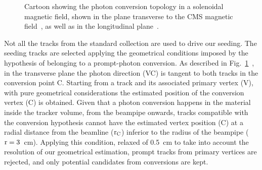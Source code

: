 \documentclass[a4paper]{jpconf}
\begin{document}
\begin{figure}[]
\centering
{}
\caption{Cartoon showing the photon conversion topology in a solenoidal magnetic field,
shown in the plane transverse  to the CMS magnetic field~, as well as  in the longitudinal plane~.}

\label{fig:algo}
\end{figure}

Not all the tracks from  the standard collection are used to drive our seeding. The seeding tracks are selected applying the geometrical conditions imposed by the hypothesis of belonging to a prompt-photon conversion. 
%
As described in Fig.~\ref{fig:algo}~, in the transverse plane the photon direction (VC) is tangent to both tracks in the conversion point C. Starting from a track and its associated primary vertex (V), with pure geometrical considerations the estimated position of the conversion vertex (C) is obtained. Given that a photon conversion happens in the material inside the tracker volume, from the beampipe onwards, tracks compatible with the conversion hypothesis cannot have the estimated vertex position (C) at a radial distance from the beamline ($\rm r_C$) inferior to the radius of the beampipe ($\rm r=3$~cm). Applying this condition, relaxed of 0.5~cm to take into account the resolution of our geometrical estimation,  prompt tracks from primary vertices are rejected, and only potential candidates from conversions are kept.
\end{document}
